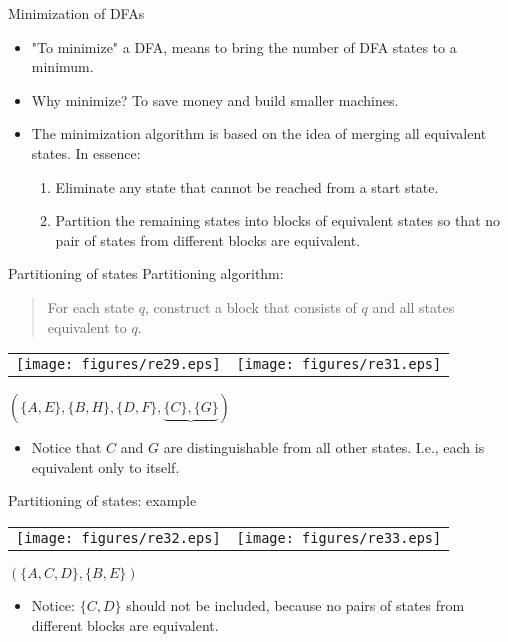 \documentclass{prosper}%
\begin{document}
\begin{slide}{Minimization of DFAs}
\begin{itemize}
\item "To minimize" a DFA, means to bring the number of DFA states to a minimum.
\item Why minimize? To save money and build smaller machines.
\item The minimization algorithm is based on the idea of merging all equivalent states. In essence:
\begin{enumerate}
\item Eliminate any state that cannot be reached from a start state.
\item Partition the remaining states into blocks of equivalent states so that no pair of states from different blocks are equivalent.
\end{enumerate}
\end{itemize}
\end{slide}

\begin{slide}{Partitioning of states}
Partitioning algorithm:\\
\begin{quote}
For each state $q$, construct a block that consists of $q$ and all states equivalent to $q$.
\end{quote}
\begin{tabular}{ll}
\texttt{[image: figures/re29.eps]}
&
\texttt{[image: figures/re31.eps]}
\end{tabular}
\begin{minipage}{7cm}
$(\{A, E\}, \{B, H\}, \{D, F \}, \underbrace{\{C \},  \{G\}})$\
\end{minipage}
\begin{itemize}
\item Notice that $C$ and $G$ are distinguishable from all other states. I.e., each is  equivalent only to itself.
\end{itemize}
\end{slide}

\begin{slide}{Partitioning of states: example}
\begin{tabular}{ll}
\texttt{[image: figures/re32.eps]}
&
\texttt{[image: figures/re33.eps]}
\end{tabular}
\begin{minipage}{10cm}
$(\{A, C, D\}, \{B, E\})$
\begin{itemize}
\item Notice: $\{C,D\}$ should not be included, because no pairs of states from different blocks are equivalent.
\end{itemize}
\end{minipage}
\end{slide}
\end{document}
